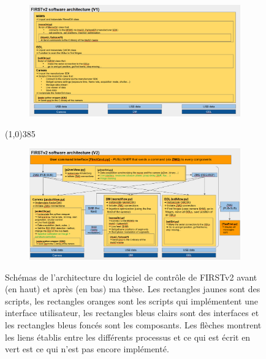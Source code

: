 \begin{figure}[ht!]
    \centering
    \begin{subfigure}{0.9\textwidth}
        \centering
        \includegraphics[width=\textwidth]{Figure_Chap2/SoftwareArchitecture_FIRSTv2_v1.png}
    \end{subfigure}
    \line(1,0){385}\\
    \begin{subfigure}{0.9\textwidth}
        \centering
        \includegraphics[width=\textwidth]{Figure_Chap2/SoftwareArchitecture_FIRSTv2_v2.png}
    \end{subfigure}
    \caption[Schémas de l'architecture du logiciel de contrôle de FIRSTv2 avant et après ma thèse.]{Schémas de l'architecture du logiciel de contrôle de FIRSTv2 avant (en haut) et après (en bas) ma thèse. Les rectangles jaunes sont des scripts, les rectangles oranges sont les scripts qui implémentent une interface utilisateur, les rectangles bleus clairs sont des interfaces et les rectangles bleus foncés sont les composants. Les flèches montrent les liens établis entre les différents processus et ce qui est écrit en vert est ce qui n'est pas encore implémenté.}
    \label{fig:SoftwareArchitecture}
\end{figure}

